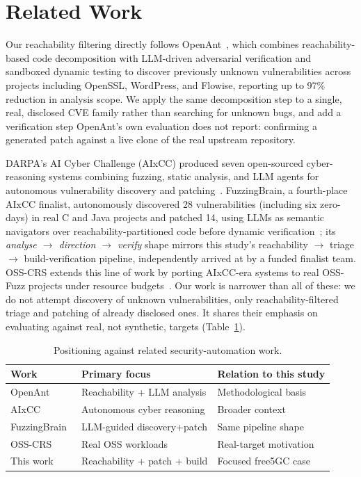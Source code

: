\documentclass[sigconf]{acmart}
\begin{document}
\section{Related Work}

Our reachability filtering directly follows OpenAnt~\cite{openant}, which combines
reachability-based code decomposition with LLM-driven adversarial verification
and sandboxed dynamic testing to discover previously unknown vulnerabilities
across projects including OpenSSL, WordPress, and Flowise, reporting up to 97\%
reduction in analysis scope. We apply the same decomposition step to a single,
real, disclosed CVE family rather than searching for unknown bugs, and add a
verification step OpenAnt's own evaluation does not report: confirming a
generated patch against a live clone of the real upstream repository.

DARPA's AI Cyber Challenge (AIxCC) produced seven open-sourced cyber-reasoning
systems combining fuzzing, static analysis, and LLM agents for autonomous
vulnerability discovery and patching~\cite{aixcc}. FuzzingBrain, a fourth-place
AIxCC finalist, autonomously discovered 28 vulnerabilities (including six
zero-days) in real C and Java projects and patched 14, using LLMs as semantic
navigators over reachability-partitioned code before dynamic
verification~\cite{fuzzingbrain}; its \emph{analyse $\rightarrow$ direction
$\rightarrow$ verify} shape mirrors this study's reachability $\rightarrow$
triage $\rightarrow$ build-verification pipeline, independently arrived at by a
funded finalist team. OSS-CRS extends this line of work by porting AIxCC-era
systems to real OSS-Fuzz projects under resource budgets~\cite{osscrs}. Our work
is narrower than all of these: we do not attempt discovery of unknown
vulnerabilities, only reachability-filtered triage and patching of already
disclosed ones. It shares their emphasis on evaluating against real, not
synthetic, targets (Table~\ref{tab:related}).

\begin{table}[t]
\centering
\caption{Positioning against related security-automation work.}
\label{tab:related}
\small
\begin{tabular}{@{}lll@{}}
\toprule
Work & Primary focus & Relation to this study \\
\midrule
OpenAnt~\cite{openant} & Reachability + LLM analysis & Methodological basis \\
AIxCC~\cite{aixcc} & Autonomous cyber reasoning & Broader context \\
FuzzingBrain~\cite{fuzzingbrain} & LLM-guided discovery+patch & Same pipeline shape \\
OSS-CRS~\cite{osscrs} & Real OSS workloads & Real-target motivation \\
This work & Reachability + patch + build & Focused free5GC case \\
\bottomrule
\end{tabular}
\end{table}
\end{document}
